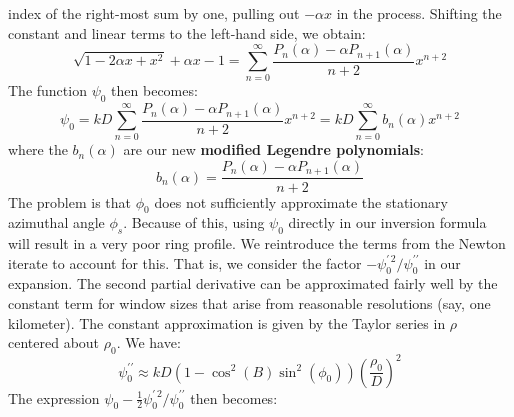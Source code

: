\documentclass{article}
\theoremstyle{plain}
\begin{document}
        index of the right-most sum by one, pulling out $-\alpha{x}$
        in the process. Shifting the constant and linear terms to
        the left-hand side, we obtain:
        \begin{equation}
            \sqrt{1-2\alpha{x}+x^{2}}+\alpha{x}-1
            =\sum_{n=0}^{\infty}
                \frac{P_{n}(\alpha)-\alpha{P}_{n+1}(\alpha)}{n+2}x^{n+2}
        \end{equation}
        The function $\psi_{0}$ then becomes:
        \begin{equation}
            \psi_{0}
            =kD\sum_{n=0}^{\infty}
                \frac{P_{n}(\alpha)-\alpha{P}_{n+1}(\alpha)}{n+2}x^{n+2}
            =kD\sum_{n=0}^{\infty}
                b_{n}(\alpha)x^{n+2}
        \end{equation}
        where the $b_{n}(\alpha)$ are our new
        \textbf{modified Legendre polynomials}:
        \begin{equation}
            \label{eqn:modified_legendre_definition}
            b_{n}(\alpha)=\frac{P_{n}(\alpha)-\alpha{P}_{n+1}(\alpha)}{n+2}
        \end{equation}
        The problem is that $\phi_{0}$ does not sufficiently approximate the
        stationary azimuthal angle $\phi_{s}$. Because of this, using
        $\psi_{0}$ directly in our inversion formula will result in a
        very poor ring profile. We reintroduce the terms from the Newton
        iterate to account for this. That is, we consider the
        factor $-\psi^{\prime\,2}_{0}/\psi^{\prime\prime}_{0}$ in our
        expansion. The second partial
        derivative can be approximated fairly well by the constant term
        for window sizes that arise from reasonable resolutions
        (say, one kilometer). The constant approximation is given by the
        Taylor series in $\rho$ centered about $\rho_{0}$. We have:
        \begin{equation}
            \psi^{\prime\prime}_{0}
            \approx{kD}\left(1-\cos^{2}(B)\sin^{2}(\phi_{0})\right)\left(
                \frac{\rho_{0}}{D}
            \right)^{2}
        \end{equation}
        The expression
        $\psi_{0}-\frac{1}{2}\psi^{\prime\,2}_{0}/\psi^{\prime\prime}_{0}$
        then becomes:
\end{document}
